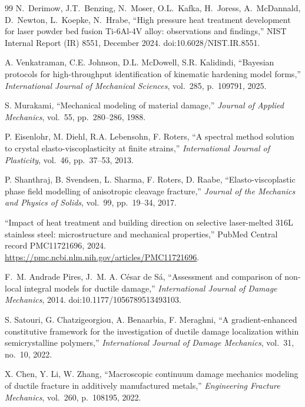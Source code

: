 \begin{thebibliography}{99}
N.~Derimow, J.T.~Benzing, N.~Moser, O.L.~Kafka, H.~Joress, A.~McDannald, D.~Newton, L.~Koepke, N.~Hrabe, ``High pressure heat treatment development for laser powder bed fusion Ti-6Al-4V alloy: observations and findings,'' NIST Internal Report (IR) 8551, December 2024. doi:10.6028/NIST.IR.8551.

A. Venkatraman, C.E. Johnson, D.L. McDowell, S.R. Kalidindi, ``Bayesian protocols for high-throughput identification of kinematic hardening model forms,'' \textit{International Journal of Mechanical Sciences}, vol.~285, p.~109791, 2025.

S. Murakami, ``Mechanical modeling of material damage,'' \textit{Journal of Applied Mechanics}, vol.~55, pp.~280--286, 1988.

P. Eisenlohr, M. Diehl, R.A. Lebensohn, F. Roters, ``A spectral method solution to crystal elasto-viscoplasticity at finite strains,'' \textit{International Journal of Plasticity}, vol.~46, pp.~37--53, 2013.

P. Shanthraj, B. Svendsen, L. Sharma, F. Roters, D. Raabe, ``Elasto-viscoplastic phase field modelling of anisotropic cleavage fracture,'' \textit{Journal of the Mechanics and Physics of Solids}, vol.~99, pp.~19--34, 2017.

``Impact of heat treatment and building direction on selective laser-melted 316L stainless steel: microstructure and mechanical properties,'' PubMed Central record PMC11721696, 2024. \url{https://pmc.ncbi.nlm.nih.gov/articles/PMC11721696}.

F.~M. Andrade Pires, J.~M. A. C\'{e}sar de S\'{a}, ``Assessment and comparison of non-local integral models for ductile damage,'' \textit{International Journal of Damage Mechanics}, 2014. doi:10.1177/1056789513493103.

S. Satouri, G. Chatzigeorgiou, A. Benaarbia, F. Meraghni, ``A gradient-enhanced constitutive framework for the investigation of ductile damage localization within semicrystalline polymers,'' \textit{International Journal of Damage Mechanics}, vol.~31, no.~10, 2022.

X. Chen, Y. Li, W. Zhang, ``Macroscopic continuum damage mechanics modeling of ductile fracture in additively manufactured metals,'' \textit{Engineering Fracture Mechanics}, vol.~260, p.~108195, 2022.
\end{thebibliography}


